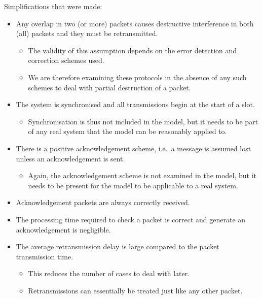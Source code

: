 Simplifications that were made:
\begin{itemize}[noitemsep]
\item Any overlap in two (or more) packets causes destructive interference in both (all) packets and they must be retransmitted.
  \begin{itemize}[noitemsep]
  \item The validity of this assumption depends on the error detection and correction schemes used.
  \item We are therefore examining these protocols in the absence of any such schemes to deal with partial destruction of a packet.
  \end{itemize}
\item The system is synchronised and all transmissions begin at the start of a slot.
  \begin{itemize}[noitemsep]
  \item Synchronisation is thus not included in the model, but it needs to be part of any real system that the model can be reasonably applied to.
  \end{itemize}
\item There is a positive acknowledgement scheme, i.e.\ a message
  is assumed lost unless an acknowledgement is sent.
  \begin{itemize}[noitemsep]
  \item Again, the acknowledgement scheme is not examined in the model, but it needs to be present for the model to be applicable to a real system.
  \end{itemize}
\item Acknowledgement packets are always correctly received.
\item The processing time required to check a packet is correct and
  generate an acknowledgement is negligible.
\item The average retransmission delay is large compared to the
  packet transmission time.
  \begin{itemize}[noitemsep]
  \item This reduces the number of cases to deal with later.
  \item Retransmissions can essentially be treated just like any other packet.
  \end{itemize}
\end{itemize}

